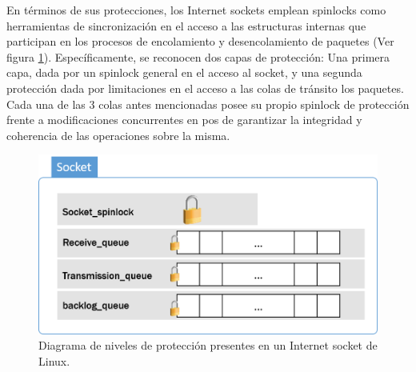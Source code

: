 En términos de sus protecciones, los Internet sockets emplean spinlocks como herramientas de sincronización en el acceso a las estructuras internas que participan en los procesos de encolamiento y desencolamiento de paquetes (Ver figura \ref{fig:socketAnathomy2}). Específicamente, se reconocen dos capas de protección: Una primera capa, dada por un spinlock general en el acceso al socket, y una segunda protección dada por limitaciones en el acceso a las colas de tránsito los paquetes. Cada una de las 3 colas antes mencionadas posee su propio spinlock de protección frente a modificaciones concurrentes en pos de garantizar la integridad y coherencia de las operaciones sobre la misma.

\begin{figure}[!h]
	\centering
	\includegraphics[scale=0.6]{imagenes/spinlocksSocket.png}
	\caption{Diagrama de niveles de protección presentes en un Internet socket de Linux.}
	\label{fig:socketAnathomy2}
\end{figure}


